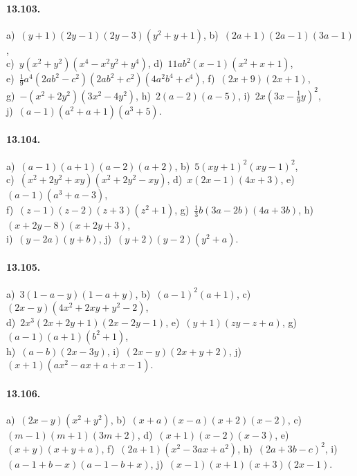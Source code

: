 \paragraph{13.103.}
a)~$(y+1)(2y-1)(2y-3)\left(y^{2}+y+1\right)$,\quad 
b)~$(2a+1)(2a-1)(3a-1)$,\protect\\
c)~$y\left(x^{2}+y^{2}\right)\left(x^{4}-x^{2}y^{2}+y^{4}\right)$,\quad 
d)~$11ab^{2}(x-1)\left(x^{2}+x+1\right)$,\protect\\
e)~$\frac{1}{9}a^{4}\left(2ab^{2}-c^{2}\right)\left(2ab^{2}+c^{2}\right)\left(4a^{2}b^{4}+c^{4}\right)$,\quad 
f)~$(2x+9)(2x+1)$,\protect\\
g)~$-\left(x^{2}+2y^{2}\right)\left(3x^{2}-4y^{2}\right)$,\quad 
h)~$2(a-2)(a-5)$,\quad 
i)~$2x\left(3x-\frac{1}{9}y\right)^{2}$,\protect\\
j)~$(a-1)\left(a^{2}+a+1\right)\left(a^{3}+5\right)$.

\paragraph{13.104.}
a)~$(a-1)(a+1)(a-2)(a+2)$,\quad 
b)~$5(xy+1)^{2}(xy-1)^{2}$,\protect\\ 
c)~$\left(x^{2}+2y^{2}+xy\right)\left(x^{2}+2y^{2}-xy\right)$,\quad 
d)~$x(2x-1)(4x+3)$,\quad 
e)~$(a-1)\left(a^{3}+a-3\right)$,\protect\\
f)~$(z-1)(z-2)(z+3)\left(z^{2}+1\right)$,\quad 
g)~$\frac{1}{3}b(3a-2b)(4a+3b)$,\quad 
h)~$(x+2y-8)(x+2y+3)$,\protect\\
i)~$(y-2a)(y+b)$,\quad 
j)~$(y+2)(y-2)\left(y^{2}+a\right)$.

\paragraph{13.105.}
a)~$3(1-a-y)(1-a+y)$,\quad 
b)~$(a-1)^{2}(a+1)$,\quad 
c)~$(2x-y)\left(4x^{2}+2xy+y^{2}-2\right)$,\protect\\
d)~$2x^{3}(2x+2y+1)(2x-2y-1)$,\quad 
e)~$(y+1)(zy-z+a)$,\quad 
g)~$(a-1)(a+1)\left(b^{2}+1\right)$,\protect\\
h)~$(a-b)(2x-3y)$,\quad
i)~$(2x-y)(2x+y+2)$,\quad 
j)~$(x+1)\left(ax^{2}-ax+a+x-1\right)$.

\paragraph{13.106.}
a)~$(2x-y)\left(x^{2}+y^{2}\right)$,\quad 
b)~$(x+a)(x-a)(x+2)(x-2)$,\quad 
c)~$(m-1)(m+1)(3m+2)$,\quad 
d)~$(x+1)(x-2)(x-3)$,\quad 
e)~$(x+y)(x+y+a)$,\quad 
f)~$(2a+1)\left(x^{2}-3ax+a^{2}\right)$,\quad 
h)~$(2a+3b-c)^{2}$,\quad 
i)~$(a-1+b-x)(a-1-b+x)$,\quad 
j)~$(x-1)(x+1)(x+3)(2x-1)$.

